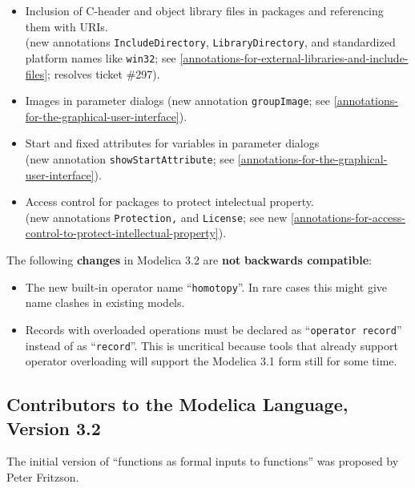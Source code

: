 \begin{itemize}
  \begin{itemize}
  \item
    Inclusion of C-header and object library files in packages and
    referencing them with URIs.\\
    (new annotations \lstinline!IncludeDirectory!, \lstinline!LibraryDirectory!, and
    standardized platform names like \lstinline!win32!; see \autoref{annotations-for-external-libraries-and-include-files}; resolves
    ticket \#297).
  \item
    Images in parameter dialogs (new annotation \lstinline!groupImage!; see
    \autoref{annotations-for-the-graphical-user-interface}).
  \item
    Start and fixed attributes for variables in parameter dialogs\\
    (new annotation \lstinline!showStartAttribute!; see \autoref{annotations-for-the-graphical-user-interface}).
  \item
    Access control for packages to protect intelectual property.\\
    (new annotations \lstinline!Protection,! and \lstinline!License!; see new \autoref{annotations-for-access-control-to-protect-intellectual-property}).
  \end{itemize}
\end{itemize}

The following \textbf{changes} in Modelica 3.2 are \textbf{not}
\textbf{backwards compatible}:

\begin{itemize}
\item
  The new built-in operator name ``\lstinline!homotopy!''. In rare cases this might
  give name clashes in existing models.
\item
  Records with overloaded operations must be declared as ``\lstinline!operator record!'' instead of as ``\lstinline!record!''. This is uncritical because tools
  that already support operator overloading will support the Modelica
  3.1 form still for some time.
\end{itemize}

\subsection{Contributors to the Modelica Language, Version 3.2}

The initial version of ``functions as formal inputs to functions'' was
proposed by Peter Fritzson.

